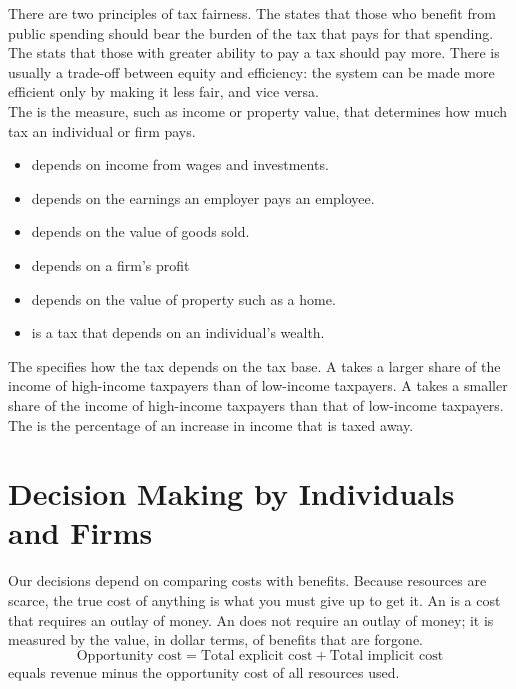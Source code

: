 \documentclass{article}
\begin{document}
There are two principles of tax fairness. The  states that those who benefit from public spending should bear the burden of the tax that pays for that spending. The  stats that those with greater ability to pay a tax should pay more. There is usually a trade-off between equity and efficiency: the system can be made more efficient only by making it less fair, and vice versa. \\ 

The  is the measure, such as income or property value, that determines how much tax an individual or firm pays. 
\begin{itemize}
  \item {} depends on income from wages and investments. 
  \item {} depends on the earnings an employer pays an employee.
  \item {} depends on the value of goods sold.
  \item {} depends on a firm's profit 
  \item {} depends on the value of property such as a home. 
  \item {} is a tax that depends on an individual's wealth. 
\end{itemize}
The  specifies how the tax depends on the tax base. A  takes a larger share of the income of high-income taxpayers than of low-income taxpayers. A  takes a smaller share of the income of high-income taxpayers than that of low-income taxpayers. The  is the percentage of an increase in income that is taxed away. 

\section{Decision Making by Individuals and Firms}

Our decisions depend on comparing costs with benefits. Because resources are scarce, the true cost of anything is what you must give up to get it. An  is a cost that requires an outlay of money. An  does not require an outlay of money; it is measured by the value, in dollar terms, of benefits that are forgone. $$\textrm{Opportunity cost} = \textrm{Total explicit cost} + \textrm{Total implicit cost}$$  equals revenue minus the opportunity cost of all resources used. \\ 
\end{document}
